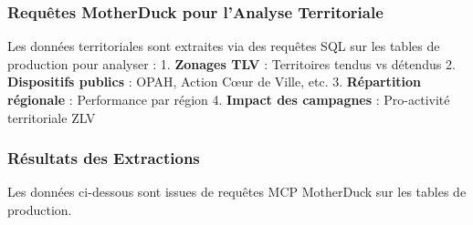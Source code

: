 \documentclass[11pt]{article}
\begin{document}
\subsubsection{Requêtes MotherDuck pour l'Analyse
Territoriale}\label{requuxeates-motherduck-pour-lanalyse-territoriale}

Les données territoriales sont extraites via des requêtes SQL sur les
tables de production pour analyser : 1. \textbf{Zonages TLV} :
Territoires tendus vs détendus 2. \textbf{Dispositifs publics} : OPAH,
Action Cœur de Ville, etc. 3. \textbf{Répartition régionale} :
Performance par région 4. \textbf{Impact des campagnes} : Pro-activité
territoriale ZLV

\subsubsection{Résultats des
Extractions}\label{ruxe9sultats-des-extractions}

Les données ci-dessous sont issues de requêtes MCP MotherDuck sur les
tables de production.
\end{document}
